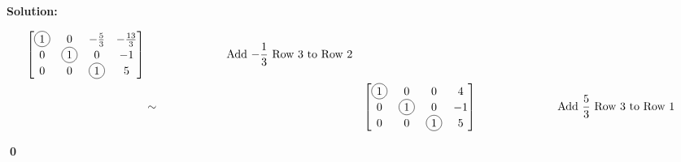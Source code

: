 \documentclass{article}
\newenvironment{solution}
{
  \ignorespaces
  \textbf{Solution:}
}
{
  \ignorespacesafterend
  \begin{flushright}
  {\bfseries \qed}
  \end{flushright}
}
\begin{document}
\begin{solution}
\begin{alignat*}{4}
\begin{bmatrix}
  \circledNumber{1} & 0 & -\frac{5}{3} & -\frac{13}{3} \\
  0 & \circledNumber{1} & 0 & -1 \\
  0 & 0 & \circledNumber{1} & 5
  \end{bmatrix}
  &\hspace{1in} \text{Add \(-\frac{1}{3}\) Row 3 to Row 2}& \\
  &\sim&
  \begin{bmatrix}
  \circledNumber{1} & 0 & 0 & 4 \\
  0 & \circledNumber{1} & 0 & -1 \\
  0 & 0 & \circledNumber{1} & 5
  \end{bmatrix}
  &\hspace{1in} \text{Add \(\frac{5}{3}\) Row 3 to Row 1}& \\
\end{alignat*}
\end{solution}
\end{document}
